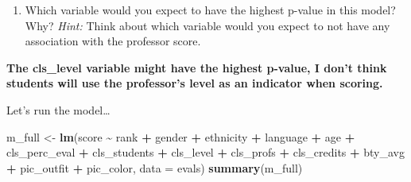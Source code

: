 \documentclass[
]{article}
\newenvironment{Shaded}{\begin{snugshade}}{\end{snugshade}}
\newcommand{\AttributeTok}[1]{\textcolor[rgb]{0.13,0.29,0.53}{#1}}
\newcommand{\FunctionTok}[1]{\textcolor[rgb]{0.13,0.29,0.53}{\textbf{#1}}}
\newcommand{\NormalTok}[1]{#1}
\newcommand{\OtherTok}[1]{\textcolor[rgb]{0.56,0.35,0.01}{#1}}
\newcommand{\SpecialCharTok}[1]{\textcolor[rgb]{0.81,0.36,0.00}{\textbf{#1}}}
\providecommand{\tightlist}{%
  \setlength{\itemsep}{0pt}\setlength{\parskip}{0pt}}
\begin{document}
\begin{enumerate}
\def\labelenumi{\arabic{enumi}.}
\setcounter{enumi}{10}
\tightlist
\item
  Which variable would you expect to have the highest p-value in this
  model? Why? \emph{Hint:} Think about which variable would you expect
  to not have any association with the professor score.
\end{enumerate}

\textbf{The cls\_level variable might have the highest p-value, I don't
think students will use the professor's level as an indicator when
scoring.}

Let's run the model\ldots{}

\begin{Shaded}
\begin{Highlighting}[]
\NormalTok{m\_full }\OtherTok{\textless{}{-}} \FunctionTok{lm}\NormalTok{(score }\SpecialCharTok{\textasciitilde{}}\NormalTok{ rank }\SpecialCharTok{+}\NormalTok{ gender }\SpecialCharTok{+}\NormalTok{ ethnicity }\SpecialCharTok{+}\NormalTok{ language }\SpecialCharTok{+}\NormalTok{ age }\SpecialCharTok{+}\NormalTok{ cls\_perc\_eval }
             \SpecialCharTok{+}\NormalTok{ cls\_students }\SpecialCharTok{+}\NormalTok{ cls\_level }\SpecialCharTok{+}\NormalTok{ cls\_profs }\SpecialCharTok{+}\NormalTok{ cls\_credits }\SpecialCharTok{+}\NormalTok{ bty\_avg }
             \SpecialCharTok{+}\NormalTok{ pic\_outfit }\SpecialCharTok{+}\NormalTok{ pic\_color, }\AttributeTok{data =}\NormalTok{ evals)}
\FunctionTok{summary}\NormalTok{(m\_full)}
\end{Highlighting}
\end{Shaded}
\end{document}
